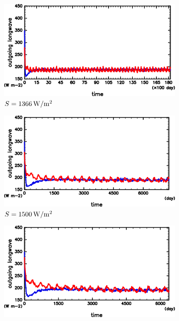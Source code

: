 \documentclass[body]{subfiles}
\begin{document}
\begin{figure}[t]
	\centering
	\begin{subfigure}{.4\textwidth}
		\centering
		\includegraphics[width=\columnwidth]{S1366/S1366_OLRA-OSRA_horimean_time0.0-18250.0-crop.png}
		\caption{\(S=1366\hmu{W/m^2}\)}\label{S1366_OLRA}
	\end{subfigure}
	\begin{subfigure}{.4\textwidth}
		\centering
		\includegraphics[width=\columnwidth]{S1500/S1500_OLRA-OSRA_horimean_time0.0-7300.0-crop.png}
		\caption{\(S=1500\hmu{W/m^2}\)}\label{S1500_OLRA}
	\end{subfigure}
	\begin{subfigure}{.4\textwidth}
		\centering
		\includegraphics[width=\columnwidth]{S1600/S1600_OLRA-OSRA_horimean_time0.0-7300.0-crop.png}

\end{subfigure}
\end{figure}
\end{document}
